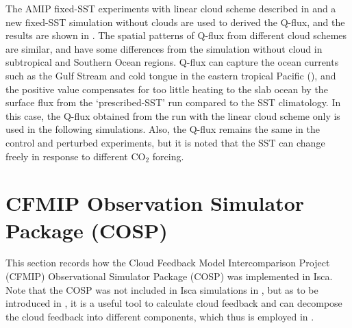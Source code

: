 The AMIP fixed-SST experiments with linear cloud scheme described in  and a new fixed-SST simulation without clouds are used to derived the Q-flux, and the results are shown in . The spatial patterns of Q-flux from different cloud schemes are similar, and have some differences from the simulation without cloud in subtropical and Southern Ocean regions. Q-flux can capture the ocean currents such as the Gulf Stream and cold tongue in the eastern tropical Pacific (), and the positive value compensates for too little heating to the slab ocean by the surface flux from the `prescribed-SST’ run compared to the SST climatology. In this case, the Q-flux obtained from the run with the linear cloud scheme only is used in the following simulations. Also, the Q-flux remains the same in the control and perturbed experiments, but it is noted that the SST can change freely in response to different CO$_2$ forcing. 


\section{CFMIP Observation Simulator Package (COSP)}
\label{sec:cosp}

This section records how the Cloud Feedback Model Intercomparison Project (CFMIP) Observational Simulator Package (COSP) was implemented in Isca. Note that the COSP was not included in Isca simulations in , but as to be introduced in , it is a useful tool to calculate cloud feedback and can decompose the cloud feedback into different components, which thus is employed in . 


